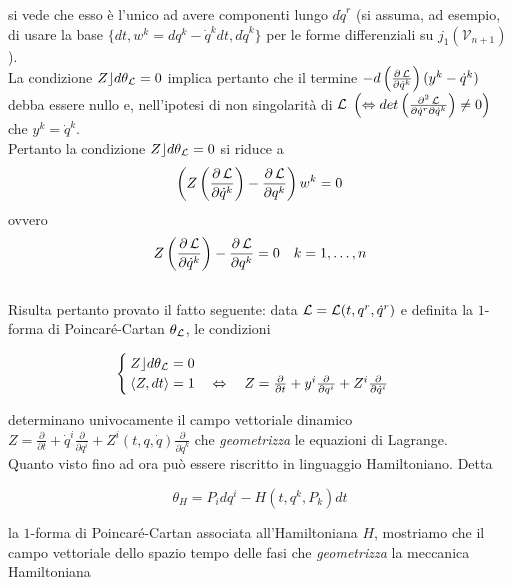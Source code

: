 si vede che esso è l'unico ad avere componenti lungo $d\dot{q}^r$ (si assuma, ad esempio, di usare la base $ \{dt, w^k=dq^k - \dot{q}^kdt, d\dot{q}^k\} $ per le forme differenziali su $j_1(\mathcal{V}_{n+1})$). \\
La condizione $Z \rfloor d \theta_{\operatorname{\mathcal{L}}} = 0$ implica pertanto che il termine $ - d \left(\frac{\partial \operatorname{\mathcal{L}}}{\partial \dot{q}^k}\right)(y^k - \dot{q}^k) $ debba essere nullo e, nell'ipotesi di non singolarità di $ \operatorname{\mathcal{L}} $ $ \left(\Leftrightarrow det \left( \frac{\partial^2 \operatorname{\mathcal{L}}}{\partial \dot{q}^r \partial \dot{q}^k}\right) \neq 0 \right)$ che $ y^k = \dot{q}^k $. \\
Pertanto la condizione $ Z \rfloor d \theta_{\operatorname{\mathcal{L}}} = 0 $ si riduce a
\begin{equation*}
\left(Z\left(\frac{\partial \operatorname{\mathcal{L}}}{\partial \dot{q}^k}\right)- \frac{\partial \operatorname{\mathcal{L}}}{\partial q^k}\right)w^k = 0
\end{equation*}
ovvero
\begin{align*}
&Z\left(\frac{\partial \operatorname{\mathcal{L}}}{\partial \dot{q}^k}\right)- \frac{\partial \operatorname{\mathcal{L}}}{\partial q^k} = 0	&k = 1, \dots , n
\end{align*}
\\ 
Risulta pertanto provato il fatto seguente: data $ \operatorname{\mathcal{L}} = \operatorname{\mathcal{L}} (t, q^r, \dot{q}^r) $ e definita la $ 1 $-forma di Poincaré-Cartan $ \theta_{\operatorname{\mathcal{L}}} $, le condizioni

\begin{equation*}
\begin{cases}
Z \rfloor d \theta_{\operatorname{\mathcal{L}}} = 0 \\
\langle Z,dt \rangle =1 \quad \Leftrightarrow \quad Z = \frac{\partial}{\partial t} + y^i \frac{\partial}{\partial q^i} + Z^i \frac{\partial}{\partial \dot{q}^i}\\
\end{cases}
\end{equation*}

determinano univocamente il campo vettoriale dinamico $ Z = \frac{\partial}{\partial t} + \dot{q}^i \frac{\partial}{\partial q^i} + Z^i (t, q, \dot{q}) \frac{\partial}{\partial \dot{q}^k} $ che \textit{geometrizza} le equazioni di Lagrange. \\
Quanto visto fino ad ora può essere riscritto in linguaggio Hamiltoniano. Detta

\begin{equation*}
\theta_H = P_i dq^i - H (t, q^k, P_k) dt
\end{equation*}

la $ 1 $-forma di Poincaré-Cartan associata all'Hamiltoniana $ H $, mostriamo che il campo vettoriale dello spazio tempo delle fasi che \textit{geometrizza} la meccanica Hamiltoniana

